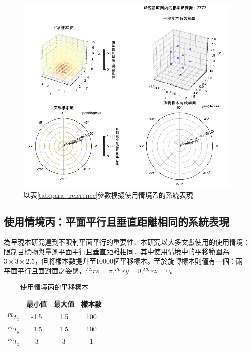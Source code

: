 \begin{figure}[htpb]
    \centering
    \includegraphics[width=15cm]{ch4pic/scene_b_solve.png}
    \caption{以表\ref{tab:para_reference}參數模擬使用情境乙的系統表現}
    \label{pic:scenario_b_solve}
\end{figure}



\subsection{使用情境丙：平面平行且垂直距離相同的系統表現}
\label{chp:scene_C}

為呈現本研究達到不限制平面平行的重要性，本研究以大多文獻使用的使用情境：限制目標物與量測平面平行且垂直距離相同，其中使用情境中的平移範圍為$3\times 3\times 2.5$，但將樣本數提升至$10000$個平移樣本。至於旋轉樣本則僅有一個：兩平面平行且面對面之姿態，$^{PL}rx=\pi,^{PL}ry=0,^{PL}rz=0$。

\begin{table}[htpb]
    \begin{center}
      \caption{使用情境丙的平移樣本}
      \label{tab:C_translate}
      \begin{tabular}{c|c|c|c} %
         & \textbf{最小值} & \textbf{最大值}&\textbf{樣本數}\\
        \hline
        $^{PL}t_x$ & -1.5 &1.5&100\\
        $^{PL}t_y$ & -1.5 & 1.5&100\\
        $^{PL}t_z$ & 3 & 3 &1\\
      \end{tabular}
    \end{center}
  \end{table}

